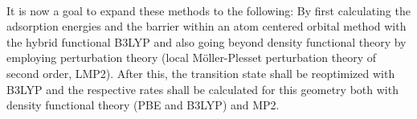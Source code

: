 \documentclass[11pt,DIV=13,BCOR=5mm,a4paper,headinclude]{scrbook}
\begin{document}
\\
It is now a goal to expand these methods to the following: By first calculating the adsorption energies and the barrier within an atom centered orbital method with the hybrid functional B3LYP and also going beyond density functional theory by employing perturbation theory (local M\"{o}ller-Plesset perturbation theory of second order, LMP2).
After this, the transition state shall be reoptimized with B3LYP and the respective rates shall be calculated for this geometry both with density functional theory (PBE and B3LYP) and MP2.

\end{document}
